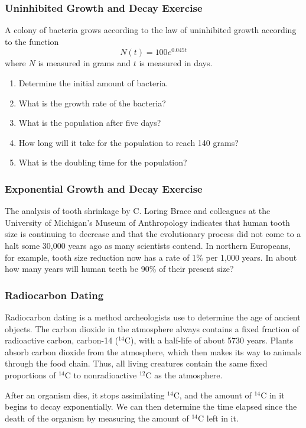 \documentclass[xcolor=dvipsnames]{beamer}
\begin{document}
\begin{frame}
  \frametitle{Uninhibited Growth and Decay Exercise}
A colony of bacteria grows according to the law of uninhibited growth
according to the function
\begin{equation}
  \label{eq:chiowezo}
  N(t)=100e^{0.045t}
\end{equation}
where $N$ is measured in grams and $t$ is measured in days.
  \begin{enumerate}
  \item Determine the initial amount of bacteria.
  \item What is the growth rate of the bacteria?
  \item What is the population after five days?
  \item How long will it take for the population to reach 140
    grams?
  \item What is the doubling time for the population?
  \end{enumerate}
\end{frame}

\begin{frame}
  \frametitle{Exponential Growth and Decay Exercise}
  {\ubung} The analysis of tooth shrinkage by C. Loring Brace and colleagues at
  the University of Michigan's Museum of Anthropology indicates that
  human tooth size is continuing to decrease and that the evolutionary
  process did not come to a halt some 30,000 years ago as many
  scientists contend. In northern Europeans, for example, tooth size
  reduction now has a rate of 1\% per 1,000 years. In about how many
  years will human teeth be 90\% of their present size?
\end{frame}

\begin{frame}
  \frametitle{Radiocarbon Dating}
Radiocarbon dating is a method archeologists use to determine the age
of ancient objects. The carbon dioxide in the atmosphere always
contains a fixed fraction of radioactive carbon, carbon-14 ($^{14}$C),
with a half-life of about 5730 years. Plants absorb carbon dioxide
from the atmosphere, which then makes its way to animals through the
food chain. Thus, all living creatures contain the same fixed
proportions of $^{14}$C to nonradioactive $^{12}$C as the atmosphere.

\medskip

After an organism dies, it stops assimilating $^{14}$C, and the amount
of $^{14}$C in it begins to decay exponentially. We can then determine
the time elapsed since the death of the organism by measuring the
amount of $^{14}$C left in it.
\end{frame}
\end{document}
